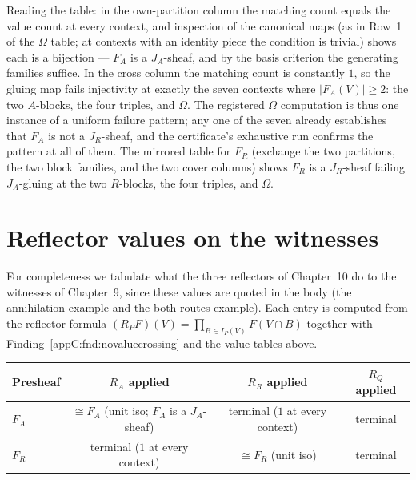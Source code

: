 Reading the table: in the own-partition column the matching count
equals the value count at every context, and inspection of the
canonical maps (as in Row~1 of the $\Omega$ table; at contexts with an
identity piece the condition is trivial) shows each is a bijection ---
$F_A$ is a $J_A$-sheaf, and by the basis criterion the generating
families suffice. In the cross column the matching count is constantly
$1$, so the gluing map fails injectivity at exactly the seven contexts
where $|F_A(V)| \ge 2$: the two $A$-blocks, the four triples, and
$\Omega$. The registered $\Omega$ computation is thus one instance of
a uniform failure pattern; any one of the seven already establishes
that $F_A$ is not a $J_R$-sheaf, and the certificate's exhaustive run
confirms the pattern at all of them. The mirrored table for $F_R$
(exchange the two partitions, the two block families, and the two
cover columns) shows $F_R$ is a $J_R$-sheaf failing $J_A$-gluing at
the two $R$-blocks, the four triples, and $\Omega$.

\section{Reflector values on the witnesses}
\label{appC:sec:reflectorvalues}

For completeness we tabulate what the three reflectors of Chapter~10 do
to the witnesses of Chapter~9, since these values are quoted in the body (the
annihilation example and the both-routes example). Each entry is
computed from the reflector formula
$(R_P F)(V) = \prod_{B \in I_P(V)} F(V \cap B)$ together with
Finding~\ref{appC:fnd:novaluecrossing} and the value tables above.

\begin{longtable}{@{}lccc@{}}
\toprule
Presheaf & $R_A$ applied & $R_R$ applied & $R_Q$ applied \\
\midrule
\endhead
\bottomrule
\endfoot
$F_A$ & $\cong F_A$ (unit iso; $F_A$ is a $J_A$-sheaf) &
terminal ($1$ at every context) & terminal \\
$F_R$ & terminal ($1$ at every context) &
$\cong F_R$ (unit iso) & terminal \\
\end{longtable}

